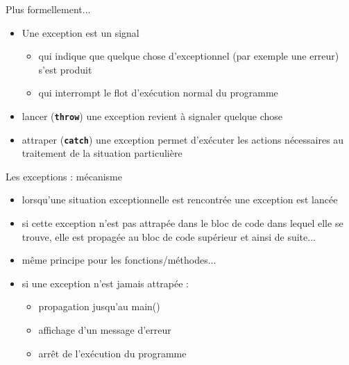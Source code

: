 \begin{frame}{Plus formellement...}
\begin{itemize}
	\item Une exception est un signal
	\begin{itemize}
		\item qui indique que quelque chose d'exceptionnel (par exemple une erreur) s'est produit
		\item qui interrompt le flot d'exécution normal du programme
	\end{itemize}
	\item lancer (\textbf{\texttt{throw}}) une exception revient à signaler quelque chose
	\item attraper (\textbf{\texttt{catch}}) une exception permet d'exécuter les actions nécessaires au traitement de la situation particulière
\end{itemize}
\end{frame} 


\begin{frame}{Les exceptions : mécanisme}
\begin{itemize}
	\item lorsqu'une situation exceptionnelle est rencontrée une exception est lancée
	\item si cette exception n'est pas attrapée dans le bloc de code dans lequel elle se trouve, elle est propagée au bloc de code supérieur et ainsi de suite...
	\item même principe pour les fonctions/méthodes...
	\item si une exception n'est jamais attrapée :
	\begin{itemize}
		\item propagation jusqu'au main()
		\item affichage d'un message d'erreur
		\item arrêt de l'exécution du programme
	\end{itemize}
\end{itemize}
\end{frame} 

